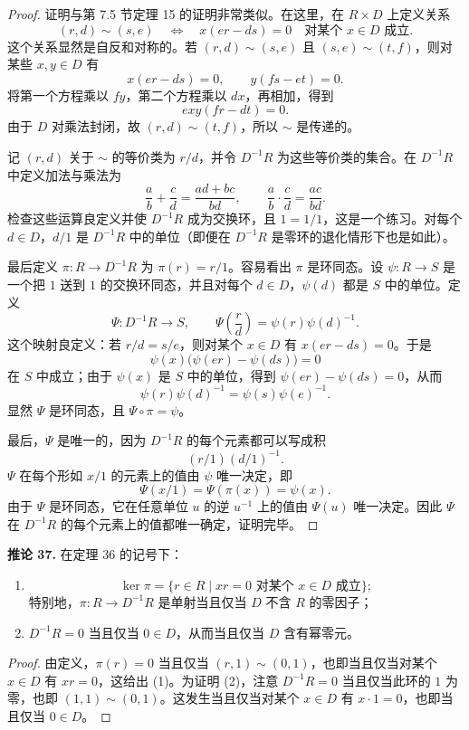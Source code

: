 \begin{proof}
	证明与第 7.5 节定理 15 的证明非常类似。在这里，在 $R\times D$ 上定义关系
	\[
	(r,d)\sim(s,e)
	\quad\Longleftrightarrow\quad
	x(er-ds)=0\quad\text{对某个 }x\in D\text{ 成立}.
	\]
	这个关系显然是自反和对称的。若 $(r,d)\sim(s,e)$ 且 $(s,e)\sim(t,f)$，则对某些 $x,y\in D$ 有
	\[
	x(er-ds)=0,
	\qquad
	y(fs-et)=0.
	\]
	将第一个方程乘以 $fy$，第二个方程乘以 $dx$，再相加，得到
	\[
	exy(fr-dt)=0.
	\]
	由于 $D$ 对乘法封闭，故 $(r,d)\sim(t,f)$，所以 $\sim$ 是传递的。
	
	记 $(r,d)$ 关于 $\sim$ 的等价类为 $r/d$，并令 $D^{-1}R$ 为这些等价类的集合。在 $D^{-1}R$ 中定义加法与乘法为
	\[
	\frac{a}{b}+\frac{c}{d}=\frac{ad+bc}{bd},
	\qquad
	\frac{a}{b}\cdot\frac{c}{d}=\frac{ac}{bd}.
	\]
	检查这些运算良定义并使 $D^{-1}R$ 成为交换环，且 $1=1/1$，这是一个练习。对每个 $d\in D$，$d/1$ 是 $D^{-1}R$ 中的单位（即便在 $D^{-1}R$ 是零环的退化情形下也是如此）。
	
	最后定义 $\pi:R\to D^{-1}R$ 为 $\pi(r)=r/1$。容易看出 $\pi$ 是环同态。设 $\psi:R\to S$ 是一个把 $1$ 送到 $1$ 的交换环同态，并且对每个 $d\in D$，$\psi(d)$ 都是 $S$ 中的单位。定义
	\[
	\Psi:D^{-1}R\longrightarrow S,
	\qquad
	\Psi\left(\frac{r}{d}\right)=\psi(r)\psi(d)^{-1}.
	\]
	这个映射良定义：若 $r/d=s/e$，则对某个 $x\in D$ 有 $x(er-ds)=0$。于是
	\[
	\psi(x)\bigl(\psi(er)-\psi(ds)\bigr)=0
	\]
	在 $S$ 中成立；由于 $\psi(x)$ 是 $S$ 中的单位，得到 $\psi(er)-\psi(ds)=0$，从而
	\[
	\psi(r)\psi(d)^{-1}=\psi(s)\psi(e)^{-1}.
	\]
	显然 $\Psi$ 是环同态，且 $\Psi\circ\pi=\psi$。
	
	最后，$\Psi$ 是唯一的，因为 $D^{-1}R$ 的每个元素都可以写成积
	\[
	(r/1)(d/1)^{-1}.
	\]
	$\Psi$ 在每个形如 $x/1$ 的元素上的值由 $\psi$ 唯一决定，即
	\[
	\Psi(x/1)=\Psi(\pi(x))=\psi(x).
	\]
	由于 $\Psi$ 是环同态，它在任意单位 $u$ 的逆 $u^{-1}$ 上的值由 $\Psi(u)$ 唯一决定。因此 $\Psi$ 在 $D^{-1}R$ 的每个元素上的值都唯一确定，证明完毕。
\end{proof}

\noindent\textbf{推论 37.} 在定理 36 的记号下：
\begin{enumerate}[label=(\arabic*)]
	\item
	\[
	\ker\pi=\{r\in R\mid xr=0\text{ 对某个 }x\in D\text{ 成立}\};
	\]
	特别地，$\pi:R\to D^{-1}R$ 是单射当且仅当 $D$ 不含 $R$ 的零因子；
	\item $D^{-1}R=0$ 当且仅当 $0\in D$，从而当且仅当 $D$ 含有幂零元。
\end{enumerate}

\begin{proof}
	由定义，$\pi(r)=0$ 当且仅当 $(r,1)\sim(0,1)$，也即当且仅当对某个 $x\in D$ 有 $xr=0$，这给出 (1)。为证明 (2)，注意 $D^{-1}R=0$ 当且仅当此环的 $1$ 为零，也即 $(1,1)\sim(0,1)$。这发生当且仅当对某个 $x\in D$ 有 $x\cdot1=0$，也即当且仅当 $0\in D$。
\end{proof}

